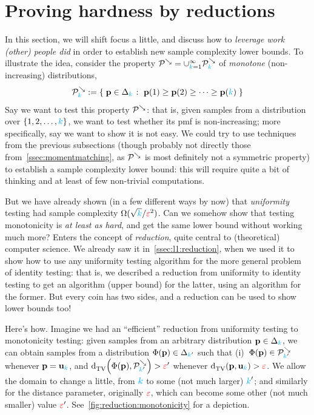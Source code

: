 \section{Proving hardness by reductions}
	\label{ssec:lb:reductions}
In this section, we will shift focus a little, and discuss how to \emph{leverage work (other) people did} in order to establish new sample complexity lower bounds. To illustrate the idea, consider the property $\mathcal{P}^{\searrow}=\cup_{{\textcolor{cyan}{k}}=1}^\infty \mathcal{P}^{\searrow}_{\textcolor{cyan}{k}}$ of \emph{monotone} (non-increasing) distributions,
\ie
\begin{equation}
\property^{\searrow}_\ab \eqdef \setOfSuchThat{ \p\in\distribs{\ab} }{ \p(1)\geq \p(2) \geq \dots \geq \p(\ab) }
\end{equation}
Say we want to test this property $\mathcal{P}^{\searrow}$: that is, given samples from a distribution over $\{1,2,\dots,{\textcolor{cyan}{k}}\}$, we want to test whether its pmf is non-increasing; more specifically, say we want to show it is not easy. We could try to use techniques from the previous subsections (though probably not directly those from~\cref{ssec:momentmatching}, as $\mathcal{P}^{\searrow}$ is most definitely not a symmetric property) to establish a sample complexity lower bound: this will require quite a bit of thinking and at least of few non-trivial computations.

But we have already shown (in a few different ways by now) that \emph{uniformity} testing had sample complexity $\Omega(\sqrt{{\textcolor{cyan}{k}}}/\textcolor{red}{\varepsilon}^2)$. Can we somehow show that testing monotonicity is \emph{at least as hard}, and get the same lower bound without working much more? Enters the concept of \emph{reduction}, quite central to (theoretical) computer science. We already saw it in~\cref{ssec:l1:reduction}, when we used it to show how to use any uniformity testing algorithm for the more general problem of identity testing: that is, we described a reduction from uniformity to identity testing to get an algorithm (upper bound) for the latter, using an algorithm for the former. But every coin has two sides, and a reduction can be used to show lower bounds too!

Here's how. Imagine we had an ``efficient'' reduction from uniformity testing to monotonicity testing: given samples from an arbitrary distribution $\mathbf{p}\in\Delta_{{\textcolor{cyan}{k}}}$, we can obtain samples from a distribution $\Phi(\mathbf{p})\in\Delta_{{\textcolor{cyan}{k}}'}$ such that (i)~$\Phi(\mathbf{p})\in\mathcal{P}^{\searrow}_{{\textcolor{cyan}{k}}'}$ whenever $\mathbf{p}=\mathbf{u}_{\textcolor{cyan}{k}}$, and $\totalvardist{\Phi(\p)}{\property^{\searrow}_{\ab'}} > \dst'$ whenever $\totalvardist{\p}{\uniform_\ab} > \dst$. We allow the domain to change a little, from ${\textcolor{cyan}{k}}$ to some (not much larger) ${\textcolor{cyan}{k}}'$; and similarly for the distance parameter, originally $\textcolor{red}{\varepsilon}$, which can become some other (not much smaller) value $\textcolor{red}{\varepsilon}'$. See~\cref{fig:reduction:monotonicity} for a depiction.

